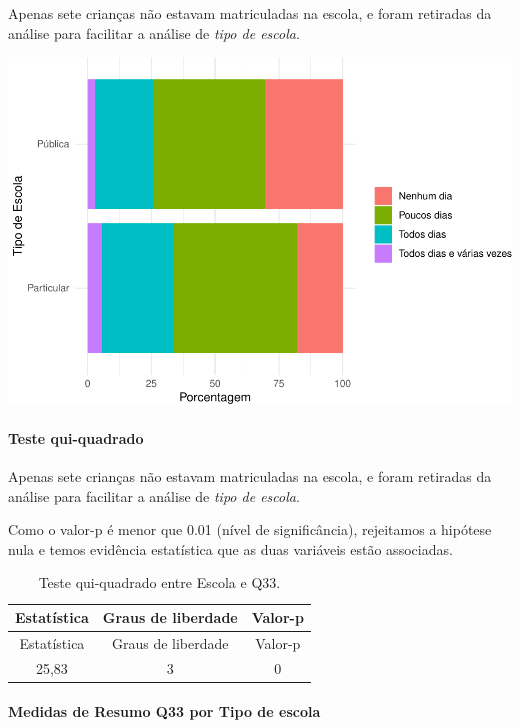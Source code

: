 \documentclass[]{article}
\let\oldparagraph\paragraph
\renewcommand{\paragraph}[1]{\oldparagraph{#1}\mbox{}}
\begin{document}
Apenas sete crianças não estavam matriculadas na escola, e foram retiradas da análise para facilitar a análise de \emph{tipo de escola}.

\begin{center}\includegraphics[width=0.75\linewidth]{relatorio_covid19_files/figure-latex/unnamed-chunk-1174-1} \end{center}

\hypertarget{teste-qui-quadrado-101}{%
\paragraph{Teste qui-quadrado}\label{teste-qui-quadrado-101}}

Apenas sete crianças não estavam matriculadas na escola, e foram retiradas da análise para facilitar a análise de \emph{tipo de escola}.

Como o valor-p é menor que 0.01 (nível de significância), rejeitamos a hipótese nula e temos evidência estatística que as duas variáveis estão associadas.

\begin{longtable}[]{@{}ccc@{}}
\caption{\label{tab:unnamed-chunk-1176}Teste qui-quadrado entre Escola e Q33.}\tabularnewline
\toprule
Estatística & Graus de liberdade & Valor-p\tabularnewline
\midrule
\endfirsthead
\toprule
Estatística & Graus de liberdade & Valor-p\tabularnewline
\midrule
\endhead
25,83 & 3 & 0\tabularnewline
\bottomrule
\end{longtable}

\cleardoublepage

\hypertarget{medidas-de-resumo-q33-por-tipo-de-escola}{%
\paragraph{Medidas de Resumo Q33 por Tipo de escola}\label{medidas-de-resumo-q33-por-tipo-de-escola}}
\end{document}
